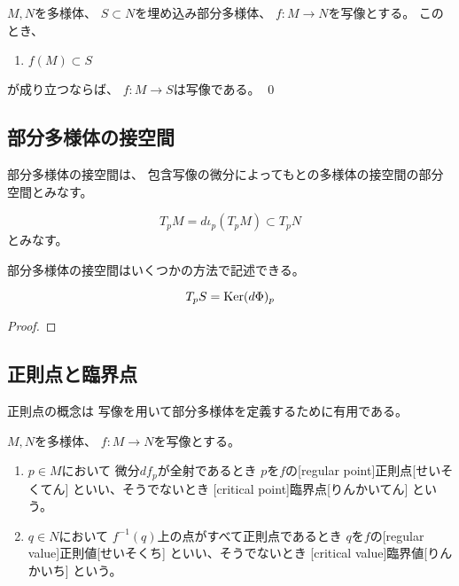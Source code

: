 \documentclass[report]{jlreq}
\begin{document}
\begin{corollary}[埋め込み多様体への値域の制限]
    $M, N$を多様体、
    $S \subset N$を埋め込み部分多様体、
    $f \colon M \to N$を{\smooth}写像とする。
    このとき、
    \begin{enumerate}
        \item $f(M) \subset S$
    \end{enumerate}
    が成り立つならば、
    $f \colon M \to S$は{\smooth}写像である。
    \qed
\end{corollary}

\subsection{部分多様体の接空間}

部分多様体の接空間は、
包含写像の微分によってもとの多様体の接空間の部分空間とみなす。

\begin{definition}[部分多様体の接空間]
    \begin{equation}
        T_pM = d\iota_p(T_pM) \subset T_pN
    \end{equation}
    とみなす。
    \TODO{}
\end{definition}

部分多様体の接空間はいくつかの方法で記述できる。

\begin{proposition}
    \begin{equation}
        T_pS = \operatorname{\mathrm{Ker}} (d\Phi)_p
    \end{equation}
    \TODO{}
\end{proposition}

\begin{proof}
    \TODO{}
\end{proof}

\subsection{正則点と臨界点}

正則点の概念は
{\smooth}写像を用いて部分多様体を定義するために有用である。

\begin{definition}[正則点と臨界点]
    $M, N$を多様体、
    $f \colon M \to N$を{\smooth}写像とする。
    \begin{enumerate}
        \item $p \in M$において
            微分$df_p$が全射であるとき
            $p$を$f$の[regular point]{正則点}[せいそくてん]
            といい、そうでないとき
            [critical point]{臨界点}[りんかいてん]
            という。
        \item $q \in N$において
            $f^{-1}(q)$上の点がすべて正則点であるとき
            $q$を$f$の[regular value]{正則値}[せいそくち]
            といい、そうでないとき
            [critical value]{臨界値}[りんかいち]
            という。
    \end{enumerate}
\end{definition}
\end{document}
